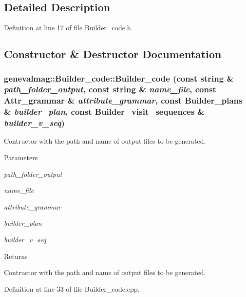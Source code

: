 \subsection{Detailed Description}


Definition at line 17 of file Builder\_\-code.h.



\subsection{Constructor \& Destructor Documentation}
\hypertarget{classgenevalmag_1_1Builder__code_a0d3743b15ad07d8e8cbe40a8fece97bf}{
\subsubsection[{Builder\_\-code}]{\setlength{\rightskip}{0pt plus 5cm}genevalmag::Builder\_\-code::Builder\_\-code (const string \& {\em path\_\-folder\_\-output}, \/  const string \& {\em name\_\-file}, \/  const {\bf Attr\_\-grammar} \& {\em attribute\_\-grammar}, \/  const {\bf Builder\_\-plans} \& {\em builder\_\-plan}, \/  const {\bf Builder\_\-visit\_\-sequences} \& {\em builder\_\-v\_\-seq})}}
\label{classgenevalmag_1_1Builder__code_a0d3743b15ad07d8e8cbe40a8fece97bf}
Contructor with the path and name of output files to be generated. 
\begin{DoxyParams}{Parameters}
\item[{\em path\_\-folder\_\-output}]\item[{\em name\_\-file}]\item[{\em attribute\_\-grammar}]\item[{\em builder\_\-plan}]\item[{\em builder\_\-v\_\-seq}]\end{DoxyParams}
\begin{DoxyReturn}{Returns}

\end{DoxyReturn}
Contructor with the path and name of output files to be generated. 

Definition at line 33 of file Builder\_\-code.cpp.

